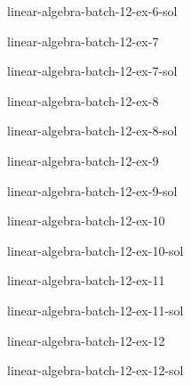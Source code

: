 \documentclass[preview]{standalone}
\begin{document}
\begin{snippetsolution}{linear-algebra-batch-12-ex-6-sol}{}
    \todo
\end{snippetsolution}

\begin{snippetexercise}{linear-algebra-batch-12-ex-7}{}
    \todo
\end{snippetexercise}

\begin{snippetsolution}{linear-algebra-batch-12-ex-7-sol}{}
    \todo
\end{snippetsolution}

\begin{snippetexercise}{linear-algebra-batch-12-ex-8}{}
    \todo
\end{snippetexercise}

\begin{snippetsolution}{linear-algebra-batch-12-ex-8-sol}{}
    \todo
\end{snippetsolution}

\begin{snippetexercise}{linear-algebra-batch-12-ex-9}{}
    \todo
\end{snippetexercise}

\begin{snippetsolution}{linear-algebra-batch-12-ex-9-sol}{}
    \todo
\end{snippetsolution}

\begin{snippetexercise}{linear-algebra-batch-12-ex-10}{}
    \todo
\end{snippetexercise}

\begin{snippetsolution}{linear-algebra-batch-12-ex-10-sol}{}
    \todo
\end{snippetsolution}

\begin{snippetexercise}{linear-algebra-batch-12-ex-11}{}
    \todo
\end{snippetexercise}

\begin{snippetsolution}{linear-algebra-batch-12-ex-11-sol}{}
    \todo
\end{snippetsolution}

\begin{snippetexercise}{linear-algebra-batch-12-ex-12}{}
    \todo
\end{snippetexercise}

\begin{snippetsolution}{linear-algebra-batch-12-ex-12-sol}{}
    \todo
\end{snippetsolution}
\end{document}

